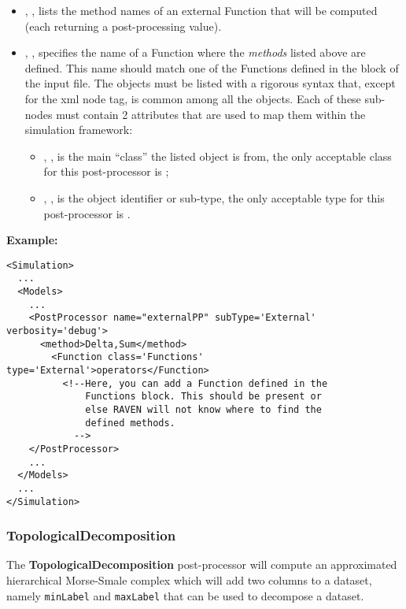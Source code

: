\begin{itemize}
  \item {}, ,
  lists the method names of an external Function that will be computed (each
  returning a post-processing value).
  \item {}, , specifies
  the name of a Function where the \textit{methods} listed above are defined.
  \nb This name should match one of the Functions defined in the
   block of the input file.
  The objects must be listed with a rigorous syntax that, except for the xml
  node tag, is common among all the objects.
  Each of these sub-nodes must contain 2 attributes that are used to map them
  within the simulation framework:

   \begin{itemize}
     \item {}, , is the main
     ``class'' the listed object is from, the only acceptable class for
     this post-processor is ;
     \item {}, , is the object
     identifier or sub-type, the only acceptable type for this post-processor is
     .
  \end{itemize}
\end{itemize}
\textbf{Example:}
\begin{lstlisting}[style=XML,morekeywords={subType,debug,name,class,type}]
<Simulation>
  ...
  <Models>
    ...
    <PostProcessor name="externalPP" subType='External' verbosity='debug'>
      <method>Delta,Sum</method>
        <Function class='Functions' type='External'>operators</Function>
          <!--Here, you can add a Function defined in the
              Functions block. This should be present or
              else RAVEN will not know where to find the
              defined methods.
            -->
    </PostProcessor>
    ...
  </Models>
  ...
</Simulation>
\end{lstlisting}

\subsubsection{TopologicalDecomposition}
\label{TopologicalDecomposition}
The \textbf{TopologicalDecomposition} post-processor will compute an
approximated hierarchical Morse-Smale complex which will add two columns to a
dataset, namely \texttt{minLabel} and \texttt{maxLabel} that can be used to
decompose a dataset.
%

